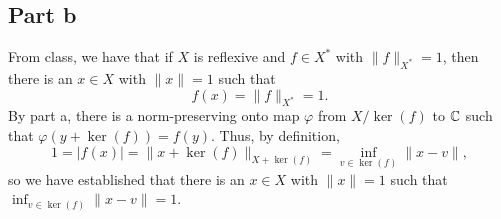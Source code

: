 \documentclass{article}
\begin{document}
\subsection{Part b}

From class, we have that if $X$ is reflexive and $f\in X^*$ with $\|f\|_{X^*}=1$, then there is an $x\in X$ with $\|x\|=1$ such that
\[
f(x)=\|f\|_{X^*}=1.
\]
By part a, there is a norm-preserving onto map $\varphi$ from $X/\ker(f)$ to $\mathbb{C}$ such that $\varphi(y+\ker(f))=f(y)$. Thus, by definition,
\[
1=|f(x)|=\|x+\ker(f)\|_{X+\ker(f)}=\inf_{v\in\ker(f)}\|x-v\|,
\]
so we have established that there is an $x\in X$ with $\|x\|=1$ such that $\inf_{v\in\ker(f)}\|x-v\|=1$.
\end{document}
